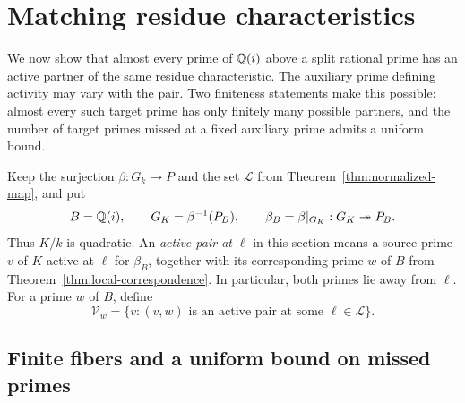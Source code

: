 \section{Matching residue characteristics}\label{sec:matching}

We now show that almost every prime of $\mathbb Q(i)$ above a split rational prime has an active partner of the same residue characteristic. The auxiliary prime defining activity may vary with the pair. Two finiteness statements make this possible: almost every such target prime has only finitely many possible partners, and the number of target primes missed at a fixed auxiliary prime admits a uniform bound.

Keep the surjection $\beta:G_k\to P$ and the set $\mathcal L$ from Theorem~\ref{thm:normalized-map}, and put
\[
 B=\mathbb Q(i),\qquad G_K=\beta^{-1}(P_B),\qquad
 \beta_B=\beta|_{G_K}:G_K\twoheadrightarrow P_B.
\]
Thus $K/k$ is quadratic. An \emph{active pair at $\ell$} in this section means a source prime $v$ of $K$ active at $\ell$ for $\beta_B$, together with its corresponding prime $w$ of $B$ from Theorem~\ref{thm:local-correspondence}. In particular, both primes lie away from $\ell$. For a prime $w$ of $B$, define
\[
 \mathcal V_w=
 \{v:\text{$(v,w)$ is an active pair at some $\ell\in\mathcal L$}\}.
\]

\subsection{Finite fibers and a uniform bound on missed primes}

